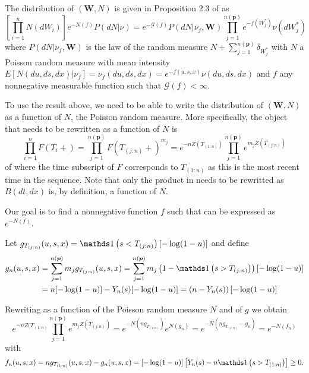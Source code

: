 The distribution of $(\boldsymbol{W}, N)$ is given in Proposition 2.3 of \cite{james2005poisson} as
\begin{equation}\label{james_poisson_joint}
\left[\prod_{i=1}^n N(dW_i)\right]e^{-N(f)}P(dN|\nu) = e^{-\mathcal{G}(f)}P(dN|\nu_f, \boldsymbol{W}) \prod_{j=1}^{n(\boldsymbol{p})} e^{-f(W_j^*)}\nu(dW_j^*)
\end{equation}
where $P(dN|\nu_f, \boldsymbol{W})$ is the law of the random measure $N + \sum_{j=1}^{n(\boldsymbol{p})} \delta_{W_j^*}$ with $N$ a Poisson random measure with mean intensity $E[N(du, ds, dx)|\nu_f] = \nu_f(du, ds,dx) = e^{-f(u,s,x)}\nu(du,ds,dx)$ and  $f$ any nonnegative measurable function such that $\mathcal{G}(f) < \infty$.

To use the result above, we need to be able to write the distribution of $(\boldsymbol{W}, N)$ as a function of $N$, the Poisson random measure. More specifically, the object that needs to be rewritten as a function of $N$ is
\begin{equation}\label{product_f}
\prod_{i=1}^n F\left(T_i + \right) = \prod_{j=1}^{n(\boldsymbol{p})} F\left(T_{(j:n)} + \right)^{m_j} = e^{-nZ(T_{(1:n)})} \prod_{j=1}^{n(\boldsymbol{p})} e^{m_j Z(T_{(j:n)})}
\end{equation}
of  where the time subscript of $F$ corresponds to $T_{(1:n)}$ as this is the most recent time in the sequence. Note that only the product in  needs to be rewritted as $B(dt, dx)$ is, by definition, a function of $N$. 

Our goal is to find a nonnegative function $f$ such that  can be expressed as $e^{-N(f)}$.

Let $g_{T_{(j:n)}}(u,s,x) = \indicator\left(s < T_{(j:n)}\right)[-\log(1-u)]$ and define 
\begin{equation*}
\begin{split}
g_n(u,s,x) &= \sum_{j=1}^{n(\boldsymbol{p})} m_j g_{T_{(j:n)}}(u,s,x) = \sum_{j=1}^{n(\boldsymbol{p})} m_j \left(1 - \indicator\left(s > T_{(j:n)}\right)\right)[-\log(1-u)]\\ &= n[-\log(1-u)] - Y_n(s)[-\log(1-u)] = \left(n- Y_n(s)\right)[-\log(1-u)]
\end{split}
\end{equation*}

Rewriting  as a function of the Poisson random measure $N$ and of $g$ we obtain
\begin{equation*}
e^{-nZ(T_{(1:n)}} \prod_{j=1}^{n(\boldsymbol{p})} e^{m_j Z(T_{(j:n)})} = e^{-N\left(ng_{T_{(1:n)}}\right)} e^{N(g_n)}  = e^{-N\left(ng_{T_{(1:n)}} - g_n\right)} = e^{-N(f_n)}
\end{equation*}
with
\begin{equation*}
f_n(u,s,x) = ng_{T_{(1:n)}}(u,s,x) - g_n(u,s,x) = [-\log(1-u)]\left[Y_n(s) - n\indicator\left(s > T_{(1:n)}\right)\right] \geq 0.
\end{equation*}

